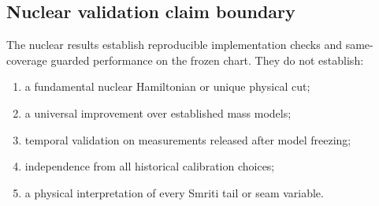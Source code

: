 \subsection{Nuclear validation claim boundary}

The nuclear results establish reproducible implementation checks and same-coverage guarded performance on the frozen chart. They do not establish:
\begin{enumerate}[label=(\roman*)]
\item a fundamental nuclear Hamiltonian or unique physical cut;
\item a universal improvement over established mass models;
\item temporal validation on measurements released after model freezing;
\item independence from all historical calibration choices;
\item a physical interpretation of every Smriti tail or seam variable.
\end{enumerate}
